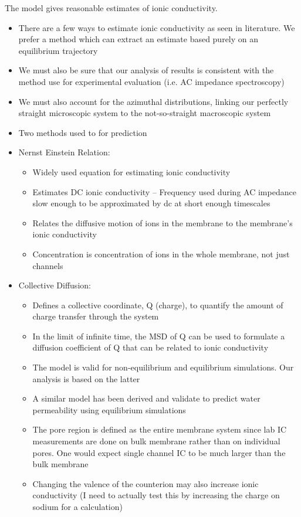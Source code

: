 \documentclass{article}
\begin{document}
\begin{itemize}
\begin{itemize}
	The model gives reasonable estimates of ionic conductivity.
	\begin{itemize}
		\item There are a few ways to estimate ionic conductivity as seen in literature. We prefer a method which can extract an estimate based purely on an equilibrium trajectory
		\item We must also be sure that our analysis of results is consistent with the method use for experimental evaluation (i.e. AC impedance spectroscopy)
		\item We must also account for the azimuthal distributions, linking our perfectly straight microscopic system to the not-so-straight macroscopic system
		\item Two methods used to for prediction
		\item Nernst Einstein Relation:
		\begin{itemize}
			\item Widely used equation for estimating ionic conductivity
			\item Estimates DC ionic conductivity -- Frequency used during AC impedance slow enough to be approximated by dc at short enough timescales
			\item Relates the diffusive motion of ions in the membrane to the membrane's ionic conductivity
			\item Concentration is concentration of ions in the whole membrane, not just channels
		\end{itemize}
		\item Collective Diffusion:
		\begin{itemize}
			\item Defines a collective coordinate, Q (charge), to quantify the amount of charge transfer through the system
			\item In the limit of infinite time, the MSD of Q can be used to formulate a diffusion coefficient of Q that can be related to ionic conductivity
			\item The model is valid for non-equilibrium and equilibrium simulations. Our analysis is based on the latter
			\item A similar model has been derived and validate to predict water permeability using equilibrium simulations
			\item The pore region is defined as the entire membrane system since lab IC measurements are done on bulk membrane rather than on individual pores. One would expect single channel IC to be much larger than the bulk membrane
			\item Changing the valence of the counterion may also increase ionic conductivity (I need to actually test this by increasing the charge on sodium for a calculation)

\end{itemize}
\end{itemize}
\end{itemize}
\end{itemize}
\end{document}
